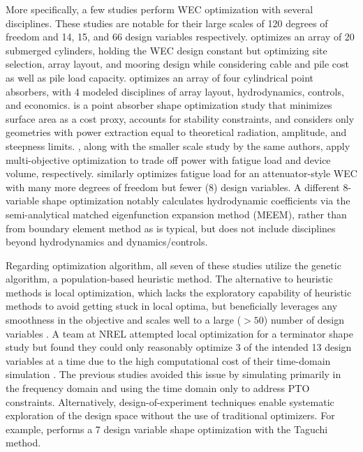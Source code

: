 More specifically, a few studies \cite{gaudin_single_2021,khanal_multi-objective_2024,edwards_optimisation_2022,garcia-teruel_reliability-based_2021} perform WEC optimization with several disciplines.
These studies are notable for their large scales of 120 degrees of freedom and 14, 15, and 66 design variables respectively.
\cite{gaudin_single_2021} optimizes an array of 20 submerged cylinders, holding the WEC design constant but optimizing site selection, array layout, and mooring design while considering cable and pile cost as well as pile load capacity.
\cite{khanal_multi-objective_2024} optimizes an array of four cylindrical point absorbers, with 4 modeled disciplines of array layout, hydrodynamics, controls, and economics.
\cite{edwards_optimisation_2022} is a point absorber shape optimization study that minimizes surface area as a cost proxy, accounts for stability constraints, and considers only geometries with power extraction equal to theoretical radiation, amplitude, and steepness limits.
\cite{garcia-teruel_reliability-based_2021}, along with the smaller scale study \cite{garcia-teruel_design_2022} by the same authors, apply multi-objective optimization to trade off power with fatigue load and device volume, respectively.
\cite{cotten_multi-objective_2022} similarly optimizes fatigue load for an attenuator-style WEC with many more degrees of freedom but fewer (8) design variables.
A different 8-variable shape optimization \cite{abdulkadir_control_2024} notably calculates hydrodynamic coefficients via the semi-analytical matched eigenfunction expansion method (MEEM), rather than from boundary element method as is typical, but does not include disciplines beyond hydrodynamics and dynamics/controls.

Regarding optimization algorithm, all seven of these studies \cite{khanal_multi-objective_2024,gaudin_single_2021,edwards_optimisation_2022,garcia-teruel_reliability-based_2021,garcia-teruel_design_2022,cotten_multi-objective_2022,abdulkadir_control_2024} utilize the genetic algorithm, a population-based heuristic method.
The alternative to heuristic methods is local optimization, which lacks the exploratory capability of heuristic methods to avoid getting stuck in local optima, but beneficially leverages any smoothness in the objective and scales well to a large ($>50$) number of design variables \cite{martins_engineering_2022}.
A team at NREL attempted local optimization for a terminator shape study but found they could only reasonably optimize 3 of the intended 13 design variables at a time due to the high computational cost of their time-domain simulation \cite{housner_numerical_2024}.
The previous studies \cite{garcia-teruel_reliability-based_2021,garcia-teruel_design_2022,cotten_multi-objective_2022} avoided this issue by simulating primarily in the frequency domain and using the time domain only to address PTO constraints.
Alternatively, design-of-experiment techniques enable systematic exploration of the design space without the use of traditional optimizers.
For example, \cite{al_shami_parameter_2019} performs a 7 design variable shape optimization with the Taguchi method.

